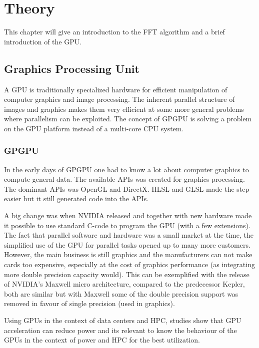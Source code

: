 \chapter{Theory}

This chapter will give an introduction to the \gls{FFT} algorithm and a brief introduction of the \gls{GPU}.

\section{Graphics Processing Unit}

A GPU is traditionally specialized hardware for efficient manipulation of computer graphics and image processing\cite{owens2008gpu}. The inherent parallel structure of images and graphics makes them very efficient at some more general problems where parallelism can be exploited. The concept of \gls{GPGPU} is solving a problem on the \gls{GPU} platform instead of a multi-core \gls{CPU} system.

\subsection{GPGPU}

In the early days of \gls{GPGPU} one had to know a lot about computer graphics to compute general data. The available APIs was created for graphics processing. The dominant \gls{API}s was OpenGL and DirectX. \gls{HLSL} and \gls{GLSL} made the step easier but it still generated code into the \gls{API}s.

A big change was when NVIDIA released {\CU} and together with new hardware made it possible to use standard C-code to program the \gls{GPU} (with a few extensions). The fact that parallel software and hardware was a small market at the time, the simplified use of the \gls{GPU} for parallel tasks opened up to many more customers. However, the main business is still graphics and the manufacturers can not make cards too expensive, especially at the cost of graphics performance (as integrating more double precision capacity would). This can be exemplified with the release of NVIDIA's Maxwell micro architecture, compared to the predecessor Kepler, both are similar but with Maxwell some of the double precision support was removed in favour of single precision (used in graphics).

Using GPUs in the context of data centers and \gls{HPC}, studies show that \gls{GPU} acceleration can reduce power\cite{huang2009energy} and its relevant to know the behaviour of the GPUs in the context of power and \gls{HPC}\cite{ghosh2012energy} for the best utilization.

